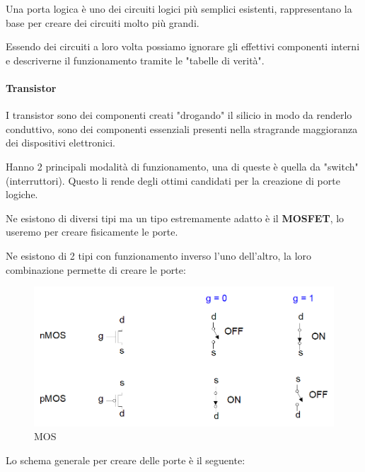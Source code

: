 \documentclass{article}
\begin{document}
Una porta logica è uno dei circuiti logici più semplici esistenti, rappresentano la base per creare dei circuiti molto più grandi.\newline

Essendo dei circuiti a loro volta possiamo ignorare gli effettivi componenti interni e descriverne il funzionamento tramite le "tabelle di verità".

\paragraph{Transistor}

I transistor sono dei componenti creati "drogando" il silicio in modo da renderlo conduttivo, sono dei componenti essenziali presenti nella stragrande maggioranza dei dispositivi elettronici.\newline

Hanno 2 principali modalità di funzionamento, una di queste è quella da "switch" (interruttori). Questo li rende degli ottimi candidati per la creazione di porte logiche.\newline

Ne esistono di diversi tipi ma un tipo estremamente adatto è il \textbf{MOSFET}, lo useremo per creare fisicamente le porte.\newline

\newpage

Ne esistono di 2 tipi con funzionamento inverso l'uno dell'altro, la loro combinazione permette di creare le porte:

\begin{figure}[ht]
    \centering
    \includegraphics[width=\linewidth]{MOS.png}
    \caption{MOS}
    \label{fig:mos}
\end{figure}

\vspace{10pt}

Lo schema generale per creare delle porte è il seguente:
\end{document}
